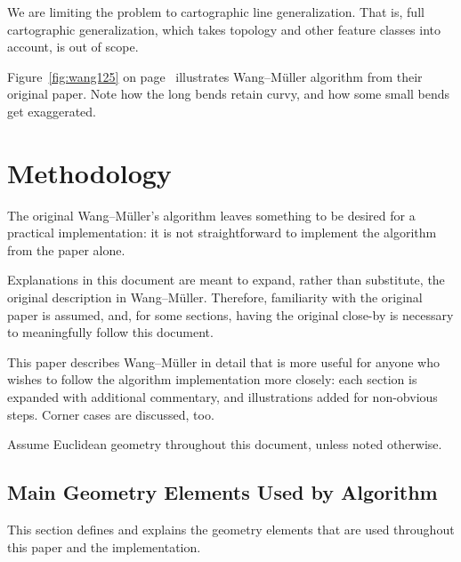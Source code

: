 \documentclass[a4paper]{article}
\newcommand{\onpage}[1]{\ref{#1} on page~\pageref{#1}}
\newcommand{\WM}{Wang--M{\"u}ller}
\begin{document}
We are limiting the problem to cartographic line generalization. That is, full
cartographic generalization, which takes topology and other feature classes
into account, is out of scope.

Figure~\onpage{fig:wang125} illustrates {\WM} algorithm from their original
paper. Note how the long bends retain curvy, and how some small bends get
exaggerated.

\section{Methodology}
\label{sec:methodology}

The original {\WM}'s algorithm \cite{wang1998line} leaves something to be
desired for a practical implementation: it is not straightforward to implement
the algorithm from the paper alone.

Explanations in this document are meant to expand, rather than substitute, the
original description in {\WM}. Therefore, familiarity with the original paper is
assumed, and, for some sections, having the original close-by is necessary to
meaningfully follow this document.

This paper describes {\WM} in detail that is more useful for anyone who wishes
to follow the algorithm implementation more closely: each section is expanded
with additional commentary, and illustrations added for non-obvious steps. Corner
cases are discussed, too.

Assume Euclidean geometry throughout this document, unless noted otherwise.

\subsection{Main Geometry Elements Used by Algorithm}
\label{sec:vocab}

This section defines and explains the geometry elements that are used
throughout this paper and the implementation.
\end{document}

